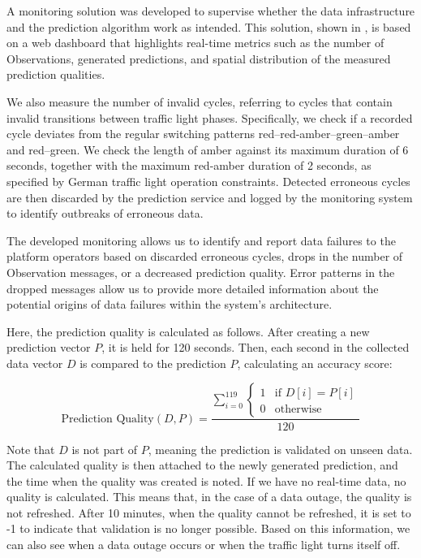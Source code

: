 A monitoring solution was developed to supervise whether the data infrastructure and the prediction algorithm work as intended. This solution, shown in , is based on a web dashboard that highlights real-time metrics such as the number of Observations, generated predictions, and spatial distribution of the measured prediction qualities. 

We also measure the number of invalid cycles, referring to cycles that contain invalid transitions between traffic light phases. Specifically, we check if a recorded cycle deviates from the regular switching patterns red--red-amber--green--amber and red--green. We check the length of amber against its maximum duration of 6 seconds, together with the maximum red-amber duration of 2 seconds, as specified by German traffic light operation constraints. Detected erroneous cycles are then discarded by the prediction service and logged by the monitoring system to identify outbreaks of erroneous data.

The developed monitoring allows us to identify and report data failures to the platform operators based on discarded erroneous cycles, drops in the number of Observation messages, or a decreased prediction quality. Error patterns in the dropped messages allow us to provide more detailed information about the potential origins of data failures within the system's architecture.

Here, the prediction quality is calculated as follows. After creating a new prediction vector $P$, it is held for 120 seconds. Then, each second in the collected data vector $D$ is compared to the prediction $P$, calculating an accuracy score:


\begin{equation} 
\text{Prediction Quality}(D, P) = 
\frac{
\sum_{i=0}^{119} 
\left\{
\begin{array}{ll}
1 & \text{if } D[i] = P[i] \\
0 & \text{otherwise}
\end{array} 
\right.
}{
120
}
\end{equation}\label{eq:predictionquality}

Note that $D$ is not part of $P$, meaning the prediction is validated on unseen data. The calculated quality is then attached to the newly generated prediction, and the time when the quality was created is noted. If we have no real-time data, no quality is calculated. This means that, in the case of a data outage, the quality is not refreshed. After 10 minutes, when the quality cannot be refreshed, it is set to -1 to indicate that validation is no longer possible. Based on this information, we can also see when a data outage occurs or when the traffic light turns itself off.

